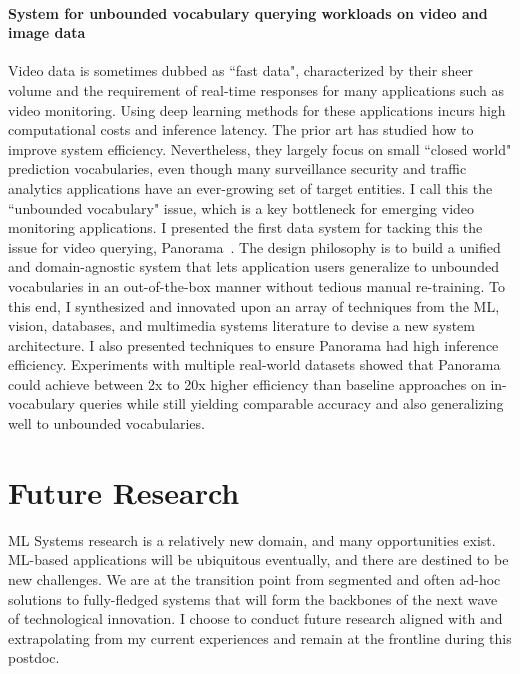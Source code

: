 \documentclass[letterpaper]{article}
\begin{document}
\paragraph{System for unbounded vocabulary querying workloads on video and image data} Video data is sometimes dubbed as ``fast data", characterized by their sheer volume and the requirement of real-time responses for many applications such as video monitoring. Using deep learning methods for these applications incurs high computational costs and inference latency. The prior art has studied how to improve system efficiency. Nevertheless, they largely focus on small ``closed world" prediction vocabularies, even though many surveillance security and traffic analytics applications have an ever-growing set of target entities. I call this the ``unbounded vocabulary" issue, which is a key bottleneck for emerging video monitoring applications. I presented the first data system for tacking this
the issue for video querying, Panorama~\cite{panorama}. The design philosophy
is to build a unified and domain-agnostic system that lets
application users generalize to unbounded vocabularies in an
out-of-the-box manner without tedious manual re-training.
To this end, I synthesized and innovated upon an array of
techniques from the ML, vision, databases, and multimedia systems literature to devise a new system architecture.
I also presented techniques to ensure Panorama had high
inference efficiency. Experiments with multiple real-world
datasets showed that Panorama could achieve between 2x to 20x
higher efficiency than baseline approaches on in-vocabulary
queries while still yielding comparable accuracy and also
generalizing well to unbounded vocabularies.

\section*{Future Research}
ML Systems research is a relatively new domain, and many opportunities exist. ML-based applications will be ubiquitous eventually, and there are destined to be new challenges. We are at the transition point from segmented and often ad-hoc solutions to fully-fledged systems that will form the backbones of the next wave of technological innovation. I choose to conduct future research aligned with and extrapolating from my current experiences and remain at the frontline during this postdoc.
\end{document}
